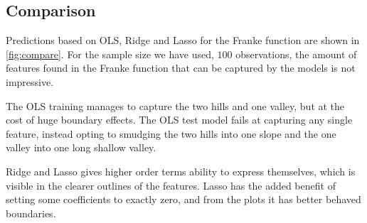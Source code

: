 \subsection{Comparison}

Predictions based on OLS, Ridge and Lasso for the Franke function are shown in
\cref{fig:compare}. For the sample size we have used, \(100\) observations, the
amount of features found in the Franke function that can be captured by the
models is not impressive.

The OLS training manages to capture the two hills and one valley, but at the
cost of huge boundary effects. The OLS test model fails at capturing any single
feature, instead opting to smudging the two hills into one slope and the one
valley into one long shallow valley.

Ridge and Lasso gives higher order terms ability to express themselves, which is visible
in the clearer outlines of the features. Lasso has the added benefit of setting
some coefficients to exactly zero, and from the plots it has better behaved
boundaries.
